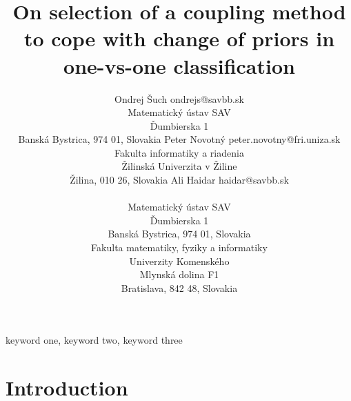 \documentclass[twoside,11pt]{article}
\begin{document}
\title{On selection of a coupling method to cope with change of priors in one-vs-one classification }

\author{\name Ondrej Šuch \email ondrejs@savbb.sk \\
       \addr Matematický ústav SAV\\
       Ďumbierska 1\\
       Banská Bystrica, 974 01, Slovakia
       \AND
       \name Peter Novotný \email peter.novotny@fri.uniza.sk \\
       \addr Fakulta informatiky a riadenia\\
       Žilinská Univerzita v Žiline\\
       Žilina, 010 26, Slovakia
       \AND
       \name Ali Haidar \email haidar@savbb.sk \\
       \begin{minipage}[t]{0.45\textwidth}
       \addr Matematický ústav SAV\\
       Ďumbierska 1\\
       Banská Bystrica, 974 01, Slovakia
       \end{minipage}\hfill
       \begin{minipage}[t]{0.45\textwidth}
       \addr Fakulta matematiky, fyziky a informatiky\\
       Univerzity Komenského \\
       Mlynská dolina F1 \\
       Bratislava, 842 48, Slovakia
       \end{minipage}
       }


\maketitle

\begin{abstract}%
\blindtext
\end{abstract}

\begin{keywords}
  keyword one, keyword two, keyword three
\end{keywords}

\section{Introduction}

\end{document}
